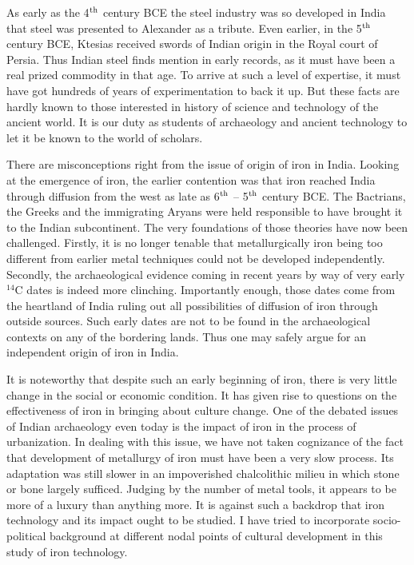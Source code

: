 As early as the 4$^{\rm th}$ century BCE the steel industry was so developed in India that steel was presented to Alexander as a tribute. Even earlier, in the 5$^{\rm th}$ century BCE, Ktesias received swords of Indian origin in the Royal court of Persia. Thus Indian steel finds mention in early records, as it must have been a real prized commodity in that age. To arrive at such a level of expertise, it must have got hundreds of years of experimentation to back it up. But these facts are hardly known to those interested in history of science and technology of the ancient world. It is our duty as students of archaeology and ancient technology to let it be known to the world of scholars.

There are misconceptions right from the issue of origin of iron in India. Looking at the emergence of iron, the earlier contention was that iron reached India through diffusion from the west as late as 6$^{\rm th}$ – 5$^{\rm th}$ century BCE. The Bactrians, the Greeks and the immigrating Aryans were held responsible to have brought it to the Indian subcontinent. The very foundations of those theories have now been challenged. Firstly, it is no longer tenable that metallurgically iron being too different from earlier metal techniques could not be developed independently. Secondly, the archaeological evidence coming in recent years by way of very early $^{14}$C dates is indeed more clinching. Importantly enough, those dates come from the heartland of India ruling out all possibilities of diffusion of iron through outside sources. Such early dates are not to be found in the archaeological contexts on any of the bordering lands. Thus one may safely argue for an independent origin of iron in India.

It is noteworthy that despite such an early beginning of iron, there is very little change in the social or economic condition. It has given rise to questions on the effectiveness of iron in bringing about culture change. One of the debated issues of Indian archaeology even today is the impact of iron in the process of urbanization. In dealing with this issue, we have not taken cognizance of the fact that development of metallurgy of iron must have been a very slow process. Its adaptation was still slower in an impoverished chalcolithic milieu in which stone or bone largely sufficed. Judging by the number of metal tools, it appears to be more of a luxury than anything more. It is against such a backdrop that iron technology and its impact ought to be studied. I have tried to incorporate socio-political background at different nodal points of cultural development in this study of iron technology. 


